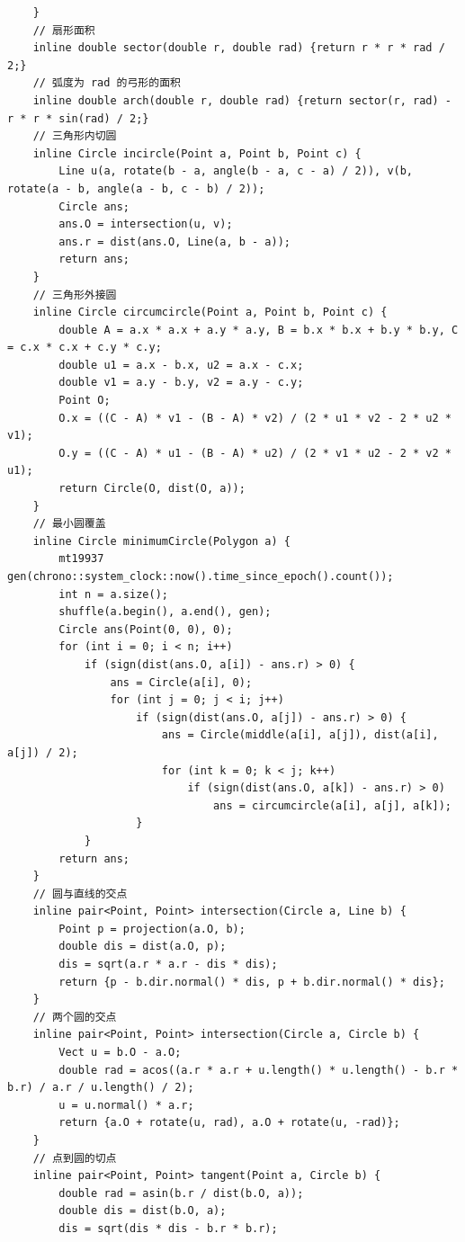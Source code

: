 \begin{verbatim}
    }
    // 扇形面积
    inline double sector(double r, double rad) {return r * r * rad / 2;}
    // 弧度为 rad 的弓形的面积
    inline double arch(double r, double rad) {return sector(r, rad) - r * r * sin(rad) / 2;}
    // 三角形内切圆
    inline Circle incircle(Point a, Point b, Point c) {
        Line u(a, rotate(b - a, angle(b - a, c - a) / 2)), v(b, rotate(a - b, angle(a - b, c - b) / 2));
        Circle ans;
        ans.O = intersection(u, v);
        ans.r = dist(ans.O, Line(a, b - a));
        return ans;
    }
    // 三角形外接圆
    inline Circle circumcircle(Point a, Point b, Point c) {
        double A = a.x * a.x + a.y * a.y, B = b.x * b.x + b.y * b.y, C = c.x * c.x + c.y * c.y;
        double u1 = a.x - b.x, u2 = a.x - c.x;
        double v1 = a.y - b.y, v2 = a.y - c.y;
        Point O;
        O.x = ((C - A) * v1 - (B - A) * v2) / (2 * u1 * v2 - 2 * u2 * v1);
        O.y = ((C - A) * u1 - (B - A) * u2) / (2 * v1 * u2 - 2 * v2 * u1);
        return Circle(O, dist(O, a));
    }
    // 最小圆覆盖
    inline Circle minimumCircle(Polygon a) {
        mt19937 gen(chrono::system_clock::now().time_since_epoch().count());
        int n = a.size();
        shuffle(a.begin(), a.end(), gen);
        Circle ans(Point(0, 0), 0);
        for (int i = 0; i < n; i++)
            if (sign(dist(ans.O, a[i]) - ans.r) > 0) {
                ans = Circle(a[i], 0);
                for (int j = 0; j < i; j++)
                    if (sign(dist(ans.O, a[j]) - ans.r) > 0) {
                        ans = Circle(middle(a[i], a[j]), dist(a[i], a[j]) / 2);
                        for (int k = 0; k < j; k++)
                            if (sign(dist(ans.O, a[k]) - ans.r) > 0)
                                ans = circumcircle(a[i], a[j], a[k]);
                    }
            }
        return ans;
    }
    // 圆与直线的交点
    inline pair<Point, Point> intersection(Circle a, Line b) {
        Point p = projection(a.O, b);
        double dis = dist(a.O, p);
        dis = sqrt(a.r * a.r - dis * dis);
        return {p - b.dir.normal() * dis, p + b.dir.normal() * dis};
    }
    // 两个圆的交点
    inline pair<Point, Point> intersection(Circle a, Circle b) {
        Vect u = b.O - a.O;
        double rad = acos((a.r * a.r + u.length() * u.length() - b.r * b.r) / a.r / u.length() / 2);
        u = u.normal() * a.r;
        return {a.O + rotate(u, rad), a.O + rotate(u, -rad)};
    }
    // 点到圆的切点
    inline pair<Point, Point> tangent(Point a, Circle b) {
        double rad = asin(b.r / dist(b.O, a));
        double dis = dist(b.O, a);
        dis = sqrt(dis * dis - b.r * b.r);

\end{verbatim}
